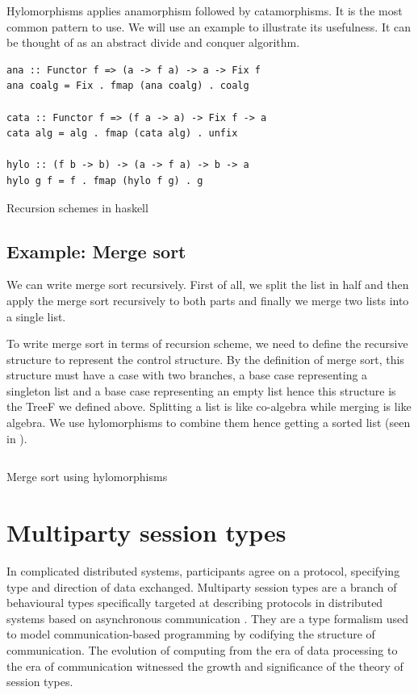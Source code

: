 Hylomorphisms applies anamorphism followed by catamorphisms. It is the most common pattern to use. We will use an example to illustrate its usefulness. It can be thought of as an abstract divide and conquer algorithm.
\begin{code}
\begin{verbatim}
ana :: Functor f => (a -> f a) -> a -> Fix f
ana coalg = Fix . fmap (ana coalg) . coalg

cata :: Functor f => (f a -> a) -> Fix f -> a
cata alg = alg . fmap (cata alg) . unfix

hylo :: (f b -> b) -> (a -> f a) -> b -> a 
hylo g f = f . fmap (hylo f g) . g
\end{verbatim}
\caption{Recursion schemes in haskell} \label{p:pal:c3}
\end{code}

\subsection{Example: Merge sort} \label{b:rs:ex}
We can write merge sort recursively. First of all, we split the list in half and then apply the merge sort recursively to both parts and finally we merge two lists into a single list. 

To write merge sort in terms of recursion scheme, we need to define the recursive structure to represent the control structure. By the definition of merge sort, this structure must have a case with two branches, a base case representing a singleton list and a base case representing an empty list hence this structure is the TreeF we defined above. Splitting a list is like co-algebra while merging is like algebra. We use hylomorphisms to combine them hence getting a sorted list (seen in ).
\begin{code}
\inputminted{haskell}{project/pal-ms.hs}
\caption{Merge sort using hylomorphisms} \label{p:pal:c4}
\end{code}
\section{Multiparty session types} \label{b:mpst}
In complicated distributed systems, participants agree on a protocol, specifying type and direction of data exchanged. Multiparty session types are a branch of behavioural types specifically targeted at describing protocols in distributed systems based on asynchronous communication \cite{coppoGentleIntroductionMultiparty2015}. They are a type formalism used to model communication-based programming by codifying the structure of communication. The evolution of computing from the era of data processing to the era of communication witnessed the growth and significance of the theory of session types.

